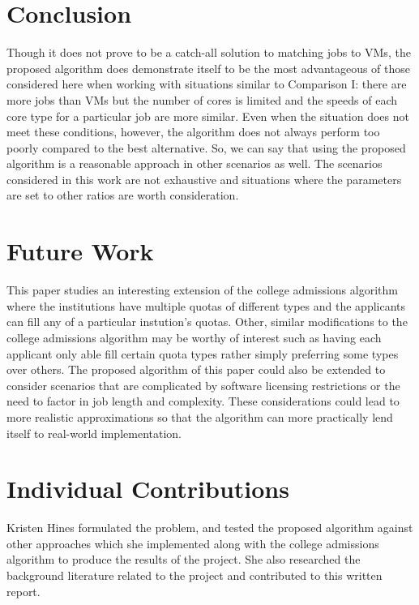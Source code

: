 \documentclass[conference]{IEEEtran}
\begin{document}
\section{Conclusion}
\label{sec:conclusion}
Though it does not prove to be a catch-all solution to matching jobs
to VMs,
the proposed algorithm does demonstrate itself to be the 
most advantageous of those considered here when working with situations
similar to Comparison I: there are more jobs than VMs but the number
of cores is limited and the speeds of each core type for a particular
job are more similar.
Even when the situation does not meet these conditions, however, 
the algorithm does not always perform too poorly compared to the best alternative.
So, we can say that using the proposed algorithm is a reasonable 
approach in other scenarios as well. 
The scenarios considered in this work are not exhaustive 
and situations where the parameters are set to other ratios 
are worth consideration.



\section{Future Work}
\label{sec:future}
This paper studies an interesting extension of the college admissions
algorithm where the institutions have multiple quotas of different types
and the applicants can fill any of a particular instution's quotas.
Other, similar modifications to the college admissions algorithm 
may be worthy of interest such as having each applicant only able fill certain 
quota types rather 
simply preferring some types over others.
The proposed algorithm of this paper could also be extended to consider 
scenarios that are complicated by software licensing restrictions
or the need to factor in job length and complexity.
These considerations could lead to more realistic approximations 
so that the algorithm can more practically lend itself to 
real-world implementation.

\section{Individual Contributions}
Kristen Hines formulated the problem, 
and tested the proposed algorithm against other 
approaches which she implemented along with the 
college admissions algorithm to produce the 
results of the project.
She also researched the background literature related to the 
project and contributed to this written report.
\end{document}
